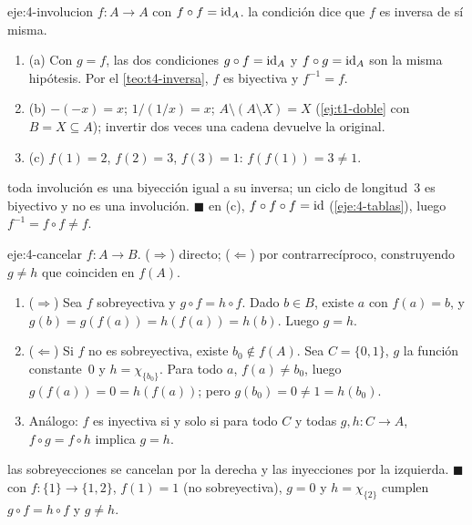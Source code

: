 \begin{solucion}{eje:4-involucion}
\datos $f\colon A\to A$ con $f\circ f=\mathrm{id}_A$.
\planteamiento la condición dice que $f$ es inversa de sí misma.
\pasos
\begin{enumerate}[label=\arabic*.]
  \item (a) Con $g=f$, las dos condiciones $g\circ f=\mathrm{id}_A$ y $f\circ g=\mathrm{id}_A$ son la misma hipótesis. Por el \cref{teo:t4-inversa}, $f$ es biyectiva y $f^{-1}=f$.
  \item (b) $-(-x)=x$; $1/(1/x)=x$; $A\setminus(A\setminus X)=X$ (\cref{ej:t1-doble} con $B=X\subseteq A$); invertir dos veces una cadena devuelve la original.
  \item (c) $f(1)=2$, $f(2)=3$, $f(3)=1$: $f(f(1))=3\neq1$.
\end{enumerate}
\resultado toda involución es una biyección igual a su inversa; un ciclo de longitud~3 es biyectivo y no es una involución. \hfill$\blacksquare$
\comprobacion en (c), $f\circ f\circ f=\mathrm{id}$ (\cref{eje:4-tablas}), luego $f^{-1}=f\circ f\neq f$.
\end{solucion}

\begin{solucion}{eje:4-cancelar}
\datos $f\colon A\to B$.
\planteamiento ($\Rightarrow$) directo; ($\Leftarrow$) por contrarrecíproco, construyendo $g\neq h$ que coinciden en $f(A)$.
\pasos
\begin{enumerate}[label=\arabic*.]
  \item ($\Rightarrow$) Sea $f$ sobreyectiva y $g\circ f=h\circ f$. Dado $b\in B$, existe $a$ con $f(a)=b$, y $g(b)=g(f(a))=h(f(a))=h(b)$. Luego $g=h$.
  \item ($\Leftarrow$) Si $f$ no es sobreyectiva, existe $b_0\notin f(A)$. Sea $C=\{0,1\}$, $g$ la función constante~0 y $h=\chi_{\{b_0\}}$. Para todo $a$, $f(a)\neq b_0$, luego $g(f(a))=0=h(f(a))$; pero $g(b_0)=0\neq1=h(b_0)$.
  \item Análogo: $f$ es inyectiva si y solo si para todo $C$ y todas $g,h\colon C\to A$, $f\circ g=f\circ h$ implica $g=h$.
\end{enumerate}
\resultado las sobreyecciones se cancelan por la derecha y las inyecciones por la izquierda. \hfill$\blacksquare$
\comprobacion con $f\colon\{1\}\to\{1,2\}$, $f(1)=1$ (no sobreyectiva), $g=0$ y $h=\chi_{\{2\}}$ cumplen $g\circ f=h\circ f$ y $g\neq h$.
\end{solucion}

